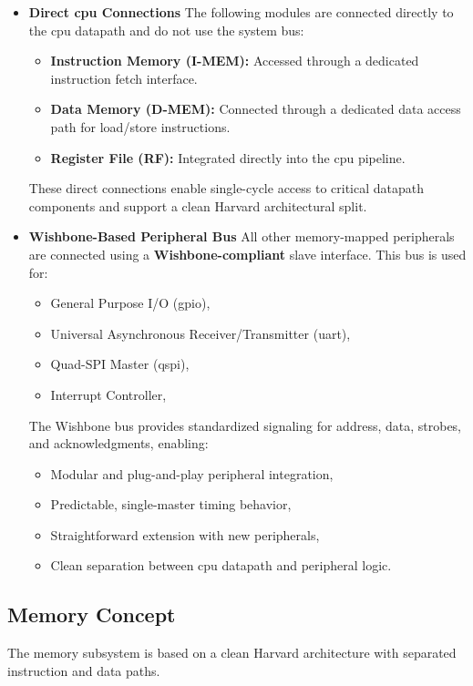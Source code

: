 \begin{itemize}
    \item \textbf{Direct \gls{cpu} Connections}  
    The following modules are connected directly to the \gls{cpu} datapath and do not use the system bus:
    \begin{itemize}
        \item \textbf{Instruction Memory (\gls{I-MEM}):} Accessed through a dedicated instruction fetch interface.
        \item \textbf{Data Memory (\gls{D-MEM}):} Connected through a dedicated data access path for load/store instructions.
        \item \textbf{Register File (RF):} Integrated directly into the \gls{cpu} \gls{pipeline}.
    \end{itemize}

    These direct connections enable single-cycle access to critical datapath components and support 
    a clean \gls{Harvard} architectural split.

    \item \textbf{Wishbone-Based Peripheral Bus}  
    All other memory-mapped peripherals are connected using a \textbf{Wishbone-compliant} slave interface.  
    This bus is used for:
    \begin{itemize}
        \item General Purpose I/O (\gls{gpio}),
        \item Universal Asynchronous Receiver/Transmitter (\gls{uart}),
        \item Quad-SPI Master (\gls{qspi}),
        \item Interrupt Controller,
    \end{itemize}

    The Wishbone bus provides standardized signaling for address, data, strobes, and acknowledgments, enabling:
    \begin{itemize}
        \item Modular and plug-and-play peripheral integration,
        \item Predictable, single-master timing behavior,
        \item Straightforward extension with new peripherals,
        \item Clean separation between \gls{cpu} datapath and peripheral logic.
    \end{itemize}
\end{itemize}


\subsection{Memory Concept}
The memory subsystem is based on a clean \gls{Harvard} architecture with separated instruction and data paths.

